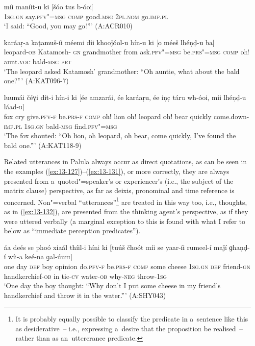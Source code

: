\begin{exe}
\ex
\label{ex:13-129}
\gll míi maníit-u ki [šóo tus b-óoi]  \\
\textsc{1sg.gn} say.\textsc{pfv"=msg} \textsc{comp} good.\textsc{msg} \textsc{2pl.nom} go.\textsc{imp.pl} \\
\glt `I said: ``Good, you may go!''' (A:ACR010)

\ex
\label{ex:13-130}
\gll karáaṛ-a kaṭamuš-íi méemi díi  khooǰóol-u hín-u ki [o méeš  lhéṇḍ-u ba] \\
leopard-\textsc{ob} Katamosh-\textsc{ gn} grandmother from  ask.\textsc{pfv"=msg} be.\textsc{prs"=msg} \textsc{comp} oh! aunt.\textsc{voc}  bald-\textsc{msg} \textsc{prt } \\
\glt `The leopard asked Katamosh' grandmother: ``Oh auntie, what about the bald one?''' (A:KAT096-7)

\ex
\label{ex:13-131}
\gll luumái čéɣi dít-i hín-i ki [ée amzarái,  ée karáaṛu,
  ée iṇc̣ táru wh-óoi, míi  lhéṇḍ-u láad-u] \\
fox cry give.\textsc{pfv-f} be.\textsc{prs-f} \textsc{comp} oh! lion  oh! leopard oh! bear quickly come.down-\textsc{imp.pl} \textsc{1sg.gn} bald-\textsc{msg} find.\textsc{pfv"=msg}  \\
\glt `The fox shouted: ``Oh lion, oh leopard, oh bear, come quickly, I've found the bald one.''' (A:KAT118-9) 
\end{exe}

Related utterances in Palula always occur as direct quotations, as can be seen in the examples (\ref{ex:13-127})--(\ref{ex:13-131}), or more correctly, they are always presented from a~quoted"=speaker's or experiencer's (i.e., the subject of the matrix clause) perspective, as far as deixis, pronominal and time reference is concerned. Non"=verbal ``utterances''\footnote{It is probably equally possible to classify the predicate in a~sentence like this as desiderative~-- i.e., expressing a~desire that the proposition be realised~-- rather than as an~uttererance predicate.} are treated in this way too, i.e., thoughts, as in (\ref{ex:13-132}), are presented from the thinking agent's perspective, as if they were uttered verbally (a marginal exception to this is found with what I refer to below as ``immediate perception predicates''). 

\begin{exe}
\ex
\label{ex:13-132}
\gll áa deés se phoó xiaál thíil-i híni ki  [tuúš čhoót míi
  se yaar-íi rumeel-í  maǰí ɡhaṇḍ-í wíi-a keé-na ɡal-úum] \\
one day \textsc{def} boy opinion do.\textsc{pfv-f} be.\textsc{prs-f} \textsc{comp}   some cheese \textsc{1sg.gn} \textsc{def} friend-\textsc{gn} handkerchief-\textsc{ob}  in tie-\textsc{cv} water-\textsc{ob} why-\textsc{neg} throw-\textsc{1sg} \\
\glt `One day the boy thought: ``Why don't I put some cheese in my friend's handkerchief and throw it in the water.''' (A:SHY043)
\end{exe}

